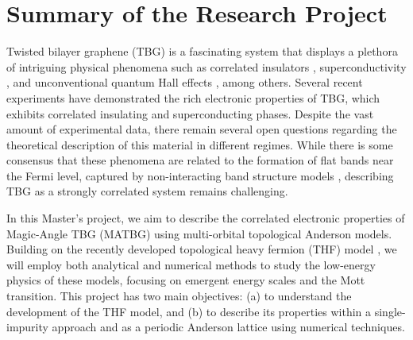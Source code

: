 \documentclass[12pt]{report}
\begin{document}
%
%
\geraTitulo
%
\folhaDeRosto
%
%
%
\tableofcontents
\thispagestyle{empty}
\clearpage
%

\sectionfont{\scshape}



\chapter{Summary of the Research Project} \label{chp:abstract}

Twisted bilayer graphene (TBG) is a fascinating system that displays a plethora of intriguing physical phenomena such as correlated insulators \cite{cao2018_correlated}, superconductivity \cite{cao2018}, and unconventional quantum Hall effects \cite{unconv_QHE_tbg_2006}, among others. Several recent experiments have demonstrated the rich electronic properties of TBG, which exhibits correlated insulating and superconducting phases. Despite the vast amount of experimental data, there remain several open questions regarding the theoretical description of this material in different regimes. While there is some consensus that these phenomena are related to the formation of flat bands near the Fermi level, captured by non-interacting band structure models \cite{macdonald2011}, describing TBG as a strongly correlated system remains challenging.

In this Master's project, we aim to describe the correlated electronic properties of Magic-Angle TBG (MATBG) using multi-orbital topological Anderson models. Building on the recently developed topological heavy fermion (THF) model \cite{topoheavyfermion2022}, we will employ both analytical and numerical methods to study the low-energy physics of these models, focusing on emergent energy scales and the Mott transition. This project has two main objectives: (a) to understand the development of the THF model, and (b) to describe its properties within a single-impurity approach and as a periodic Anderson lattice using numerical techniques.
\end{document}
